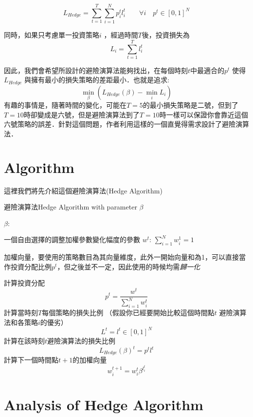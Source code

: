 \documentclass[12pt]{report}
\numberwithin{equation}{section}
\begin{document}
\begin{CJK}{UTF8}{bsmi}
\[ L_{Hedge} = \sum_{t=1}^T \sum_{i=1}^N p_i^t l_i^t \qquad \forall i \quad p^t \in [0,1]^N \]


同時，如果只考慮單一投資策略$i$ ，經過時間$T$後，投資損失為
\begin{equation}
 L_{i} = \sum_{t=1}^T l_i^t 
\end{equation}


因此，我們會希望所設計的避險演算法能夠找出，在每個時刻$t$中最適合的$p^t$ 使得$L_{Hedge}$ 與擁有最小的損失策略的差距最小．也就是追求:
\[ \min_{\beta} ( L_{Hedge}(\beta) - \min_i L_i) \]
有趣的事情是，隨著時間的變化，可能在$T=5$的最小損失策略是二號，但到了$T=10$時卻變成是六號，但是避險演算法到了$T=10$時一樣可以保證你會靠近這個六號策略的誤差．針對這個問題，作者利用這樣的一個直覺得需求設計了避險演算法．


\section {Algorithm}

這裡我們將先介紹這個避險演算法(Hedge Algorithm)

\begin{algorithm}[H]
  \caption{避險演算法Hedge Algorithm with parameter $\beta$}
  \label{code:OTCme}
  \begin{algorithmic}[1]
	\Require $\beta$: 
	
		一個自由選擇的調整加權參數變化幅度的參數	
	\Require $w^t$: $\sum_{i=1}^N w^1_i = 1 $
	 
	 加權向量，要使用的策略數目為其向量維度，此外一開始向量和為1，可以直接當作投資分配比例$p^t$，但之後並不一定，因此使用的時候均需\textit{歸一化}
     
   \Ensure
	\State 計算投資分配
		\[ p^t = \frac{w^t}{\sum_{i=1}^N w^t_i }\]
	\State 計算當時刻$T$每個策略的損失比例 （假設你已經要開始比較這個時間點$t$ 避險演算法和各策略$i$的優劣）
		\[ L^t = l^t \in [0,1]^N \]
	\State 計算在該時刻$t$避險演算法的損失比例
		\[ L_{Hedge}(\beta)^t = p^t l^t \]
	\State 計算下一個時間點$t+1$的加權向量
		\begin{equation}
		w_i^{t+1} = w_i^t \beta ^{l^t_i}
		\label{eq:weightedvectorupdateprocess}
		\end{equation}
	\EndFor
	\end{algorithmic}
\end{algorithm}

\section{Analysis of Hedge Algorithm}


\end{CJK}
\end{document}

